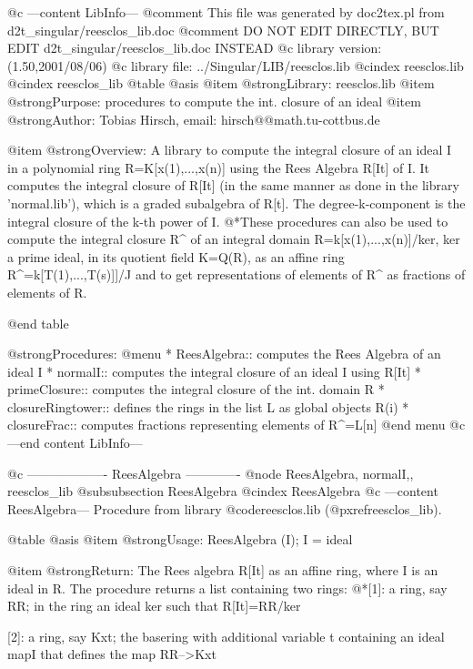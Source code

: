 @c ---content LibInfo---
@comment This file was generated by doc2tex.pl from d2t_singular/reesclos_lib.doc
@comment DO NOT EDIT DIRECTLY, BUT EDIT d2t_singular/reesclos_lib.doc INSTEAD
@c library version: (1.50,2001/08/06)
@c library file: ../Singular/LIB/reesclos.lib
@cindex reesclos.lib
@cindex reesclos_lib
@table @asis
@item @strong{Library:}
reesclos.lib
@item @strong{Purpose:}
     procedures to compute the int. closure of an ideal
@item @strong{Author:}
Tobias Hirsch, email: hirsch@@math.tu-cottbus.de

@item @strong{Overview:}
A library to compute the integral closure of an ideal I in a polynomial ring
R=K[x(1),...,x(n)] using the Rees Algebra R[It] of I. It computes the integral
closure of R[It] (in the same manner as done in the library 'normal.lib'),
which is a graded subalgebra of R[t]. The degree-k-component is the integral
closure of the k-th power of I.
@*These procedures can also be used to compute the integral closure R^ of an
integral domain R=k[x(1),...,x(n)]/ker, ker a prime ideal, in its quotient
field K=Q(R), as an affine ring R^=k[T(1),...,T(s)]]/J and to get
representations of elements of R^ as fractions of elements of R.

@end table

@strong{Procedures:}
@menu
* ReesAlgebra:: computes the Rees Algebra of an ideal I
* normalI:: computes the integral closure of an ideal I using R[It]
* primeClosure:: computes the integral closure of the int. domain R
* closureRingtower:: defines the rings in the list L as global objects R(i)
* closureFrac:: computes fractions representing elements of R^=L[n]
@end menu
@c ---end content LibInfo---

@c ------------------- ReesAlgebra -------------
@node ReesAlgebra, normalI,, reesclos_lib
@subsubsection ReesAlgebra
@cindex ReesAlgebra
@c ---content ReesAlgebra---
Procedure from library @code{reesclos.lib} (@pxref{reesclos_lib}).

@table @asis
@item @strong{Usage:}
ReesAlgebra (I); I = ideal

@item @strong{Return:}
The Rees algebra R[It] as an affine ring, where I is an ideal in R.
The procedure returns a list containing two rings:
@*[1]: a ring, say RR; in the ring an ideal ker such that R[It]=RR/ker

[2]: a ring, say Kxt; the basering with additional variable t
containing an ideal mapI that defines the map RR-->Kxt

